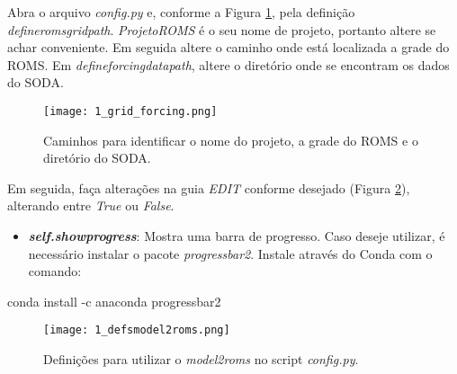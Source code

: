 \noindent Abra o arquivo \textit{config.py} e, conforme a Figura \textcolor{bleu_cite}{\ref{editmaskgrid}}, pela definição \textit{defineromsgridpath}. \textit{ProjetoROMS} é o seu nome de projeto, portanto altere se achar conveniente. Em seguida altere o caminho onde está localizada a grade do ROMS. Em \textit{defineforcingdatapath}, altere o diretório onde se encontram os dados do SODA.

\begin{figure}[H]
    \centering
    \captionsetup{justification=centering}
    \texttt{[image: 1\_grid\_forcing.png]}
    \caption{Caminhos para identificar o nome do projeto, a grade do ROMS e o diretório do SODA.}
    \label{editmaskgrid}
\end{figure}
\bigskip

\noindent Em seguida, faça alterações na guia \textit{EDIT} conforme desejado (Figura \textcolor{bleu_cite}{\ref{configmodel2roms}}), alterando entre \textit{True} ou \textit{False}.
\bigskip

\begin{itemize}
\item \textbf{\textit{self.showprogress}}: Mostra uma barra de progresso. Caso deseje utilizar, é necessário instalar o pacote \textit{progressbar2}. Instale através do Conda com o comando:
\end{itemize}
\bigskip
\begin{bashcode}
conda install -c anaconda progressbar2
\end{bashcode}
\bigskip

\begin{figure}[H]
    \centering
    \captionsetup{justification=centering}
    \texttt{[image: 1\_defsmodel2roms.png]}
    \caption{Definições para utilizar o \textit{model2roms} no script \textit{config.py}.}
    \label{configmodel2roms}
\end{figure}
\bigskip

